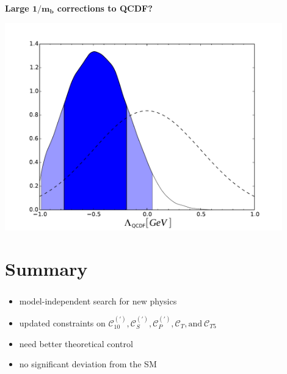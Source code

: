 \documentclass[english]{beamer}
\newcommand{\slide}[2][t]{\begin{frame}[#1] \frametitle{\insertsection} #2 \end{frame}}
\begin{document}
\slide{

    \frametitle{\insertsubsectionhead}

    {\large\textbf{Large $\boldsymbol{1/m_b}$ corrections to QCDF?}}

    \begin{center}
        \includegraphics[width=0.9\textwidth]{figures/SL_large_recoil}
    \end{center}

}

\section{Summary}

\slide{ %

    \begin{itemize}

        \item model-independent search for new physics
        \item updated constraints on $\mathcal{C}_{10} ^{(\prime)} , \mathcal{C}_S ^{(\prime)} , \mathcal{C}_P ^{(\prime)} , \mathcal{C}_T , \text{and} ~ \mathcal{C}_{T5}$
        \item need better theoretical control
        \item no significant deviation from the SM

    \end{itemize}


}
\end{document}
